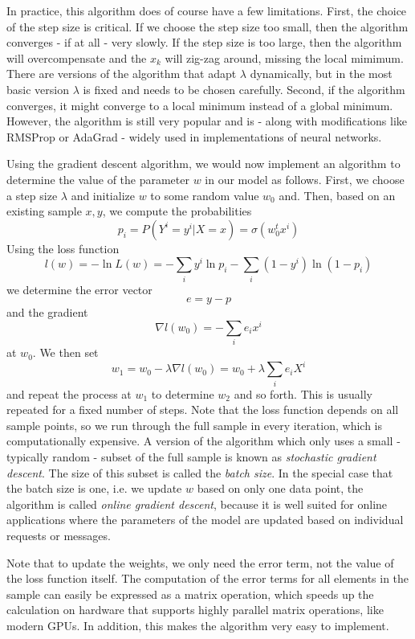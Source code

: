 \documentclass[a4paper, draft]{report}
\numberwithin{section}{chapter}
\numberwithin{equation}{chapter}
\theoremstyle{own}
\theoremstyle{remark}
\begin{document}
In practice, this algorithm does of course have a few limitations. First, the choice of the step size is critical. If we choose the step size too small, then the algorithm converges - if at all - very slowly. If the step size is too large, then the algorithm will overcompensate and the $x_k$ will zig-zag around, missing the local mimimum. There are versions of the algorithm that adapt $\lambda$ dynamically, but in the most basic version $\lambda$ is fixed and needs to be chosen carefully. Second, if the algorithm converges, it might converge to a local minimum instead of a global minimum. 
However, the algorithm is still very popular and is - along with modifications like RMSProp or AdaGrad - widely used in implementations of neural networks. 

Using the gradient descent algorithm, we would now implement an algorithm to determine the value of the parameter $w$ in our model as follows. First, we choose a step size $\lambda$ and initialize $w$ to some random value $w_0$ and. Then, based on an existing sample $x, y$, we compute the probabilities
$$
p_i = P(Y^i = y^i | X = x) = \sigma(w_0^t x^i )
$$
Using the loss function
$$
l(w) =  - \ln L(w) = -  \sum_i y^i \ln p_i - \sum_i (1-y^i) \ln (1-p_i)
$$
we determine the error vector
$$
e = y - p
$$
and the gradient
$$
\nabla l(w_0) = - \sum_i e_i x^i
$$
at $w_0$. We then set
$$
w_1 = w_0 - \lambda \nabla l(w_0) = w_0 + \lambda \sum_i e_i X^i
$$
and repeat the process at $w_1$ to determine $w_2$ and so forth. This is usually repeated for a fixed number of steps. Note that the loss function depends on all sample points, so we run through the full sample in every iteration, which is computationally expensive. A version of the algorithm which only uses a small -typically random - subset of the full sample is known as {\em stochastic gradient descent}. The size of this subset is called the {\em batch size}. In the special case that the batch size is one, i.e. we update $w$ based on only one data point, the algorithm is called {\em online gradient descent}, because it is well suited for online applications where the parameters of the model are updated based on individual requests or messages.

Note that to update the weights, we only need the error term, not the value of the loss function itself. The computation of the error terms for all elements in the sample can easily be expressed as a matrix operation, which speeds up the calculation on hardware that supports highly parallel matrix operations, like modern GPUs. In addition, this makes the algorithm very easy to implement. 
\end{document}
